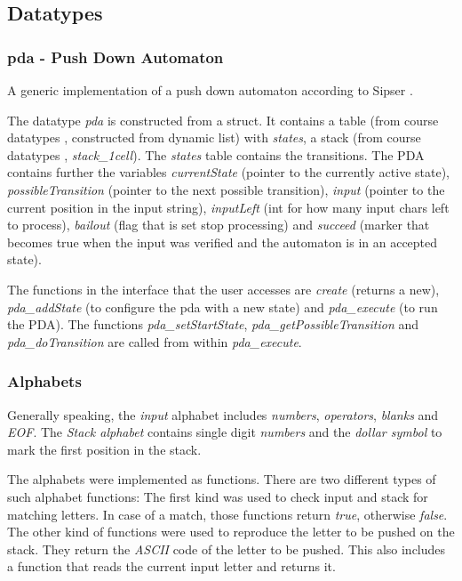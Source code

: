 \documentclass[a4paper,11pt,twoside]{article}
\begin{document}
\subsection{Datatypes}

\subsubsection{pda - Push Down Automaton}
A generic implementation of a push down automaton according to Sipser
\cite[pp 112-125]{sipser2012}.

The datatype \textit{pda} is constructed from a struct. It contains a
table (from course datatypes \cite{datatypes}, constructed from
dynamic list) with \textit{states}, a stack (from course datatypes
\cite{datatypes}, \textit{stack\_1cell}). The \textit{states} table contains
the transitions. The PDA contains further the variables
\textit{currentState} (pointer to the currently active state),
\textit{possibleTransition} (pointer to the next possible transition),
\textit{input} (pointer to the current position in the input string), 
\textit{inputLeft} (int for how many input chars left to process),
\textit{bailout} (flag that is set stop processing) and
\textit{succeed} (marker that becomes true when the input was verified
and the automaton is in an accepted state).

The functions in the interface that the user accesses are \textit{create}
(returns a new), \textit{pda\_addState} (to configure the
pda with a new state) and \textit{pda\_execute} (to run the PDA). The
functions \textit{pda\_setStartState},
\textit{pda\_getPossibleTransition} and \textit{pda\_doTransition} are
called from within \textit{pda\_execute}. 


\subsubsection{Alphabets}
Generally speaking, the \textit{input} alphabet includes
\textit{numbers}, \textit{operators}, \textit{blanks} and
\textit{EOF}. The \textit{Stack alphabet} contains single digit
\textit{numbers} and the \textit{dollar symbol} to mark the first
position in the stack.   

The alphabets were implemented as functions. There are two different
types of such alphabet functions: The first kind was used to check
input and stack for matching letters. In case of a match, those
functions return \textit{true}, otherwise \textit{false}. The other
kind of functions were used to reproduce the letter to be pushed on the
stack. They return the \textit{ASCII} code of the letter to be pushed. This
also includes a function that reads the current input letter and  
returns it.
\end{document}
